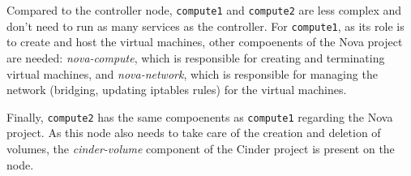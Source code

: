 Compared to the controller node, \texttt{compute1} and \texttt{compute2} are less complex and don't need to run as many services as the controller. 
For \texttt{compute1}, as its role is to create and host the virtual machines, other compoenents of the Nova project are needed: \textit{nova-compute}, which is responsible for creating and terminating virtual machines, and \textit{nova-network}, which is responsible for managing the network (bridging, updating iptables rules) for the virtual machines. 

Finally, \texttt{compute2} has the same compoenents as \texttt{compute1} regarding the Nova project. 
As this node also needs to take care of the creation and deletion of volumes, the \textit{cinder-volume} component of the Cinder project is present on the node. 


